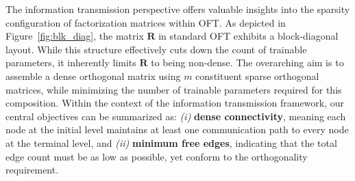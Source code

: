 The information transmission perspective offers valuable insights into the sparsity configuration of factorization matrices within OFT. As depicted in Figure~\ref{fig:blk_diag}, the matrix $\bm{R}$ in standard OFT exhibits a block-diagonal layout. While this structure effectively cuts down the count of trainable parameters, it inherently limits $\bm{R}$ to being non-dense. The overarching aim is to assemble a dense orthogonal matrix using $m$ constituent sparse orthogonal matrices, while minimizing the number of trainable parameters required for this composition. Within the context of the information transmission framework, our central objectives can be summarized as: \emph{(i)} \textbf{dense connectivity}, meaning each node at the initial level maintains at least one communication path to every node at the terminal level, and \emph{(ii)} \textbf{minimum free edges}, indicating that the total edge count must be as low as possible, yet conform to the orthogonality requirement. 